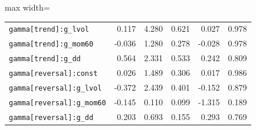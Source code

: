 \begin{table}[!htbp]
\begin{adjustbox}{max width=\textwidth}
\begin{tabular}{lrrrrr}
\texttt{gamma[trend]:g\_lvol} & 0.117 & 4.280 & 0.621 & 0.027 & 0.978\\
\texttt{gamma[trend]:g\_mom60} & -0.036 & 1.280 & 0.278 & -0.028 & 0.978\\
\texttt{gamma[trend]:g\_dd} & 0.564 & 2.331 & 0.533 & 0.242 & 0.809\\
\texttt{gamma[reversal]:const} & 0.026 & 1.489 & 0.306 & 0.017 & 0.986\\
\texttt{gamma[reversal]:g\_lvol} & -0.372 & 2.439 & 0.401 & -0.152 & 0.879\\
\texttt{gamma[reversal]:g\_mom60} & -0.145 & 0.110 & 0.099 & -1.315 & 0.189\\
\texttt{gamma[reversal]:g\_dd} & 0.203 & 0.693 & 0.155 & 0.293 & 0.769\\
\bottomrule
\end{tabular}
\end{adjustbox}
\end{table}